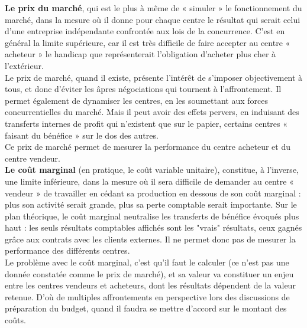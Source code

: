 \documentclass{tufte-handout}
\begin{document}
\textbf{Le prix du marché}, qui est le plus à même de « simuler » le fonctionnement du marché, dans la mesure où il donne pour chaque centre le résultat qui serait celui d’une entreprise indépendante confrontée aux lois de la concurrence. C’est en général la limite supérieure, car il est très difficile de faire accepter au centre « acheteur » le handicap que représenterait l’obligation d’acheter plus cher à l’extérieur.\\
Le prix de marché, quand il existe, présente l’intérêt de s’imposer objectivement à tous, et donc d’éviter les âpres négociations qui tournent à l’affrontement. Il permet également de dynamiser les centres, en les soumettant aux forces concurrentielles du marché. Mais il peut avoir des effets pervers, en induisant des transferts internes de profit qui n’existent que sur le papier, certains centres « faisant du bénéfice » sur le dos des autres.\\
Ce prix de marché permet de mesurer la performance du centre acheteur et du centre vendeur.\\

\textbf{Le coût marginal} (en pratique, le coût variable unitaire), constitue, à l’inverse, une limite inférieure, dans la mesure où il sera difficile de demander au centre « vendeur » de travailler en cédant sa production en dessous de son coût marginal : plus son activité serait grande, plus sa perte comptable serait importante. Sur le plan théorique, le coût marginal neutralise les transferts de bénéfice évoqués plus haut : les seuls résultats comptables affichés sont les "vrais" résultats, ceux gagnés grâce aux contrats avec les clients externes. Il ne permet donc pas de mesurer la performance des différents centres.\\
Le problème avec le coût marginal, c’est qu’il faut le calculer (ce n’est pas une donnée constatée comme le prix de marché), et sa valeur va constituer un enjeu entre les centres vendeurs et acheteurs, dont les résultats dépendent de la valeur retenue. D’où de multiples affrontements en perspective lors des discussions de préparation du budget, quand il faudra se mettre d’accord sur le montant des coûts.\\
\end{document}
